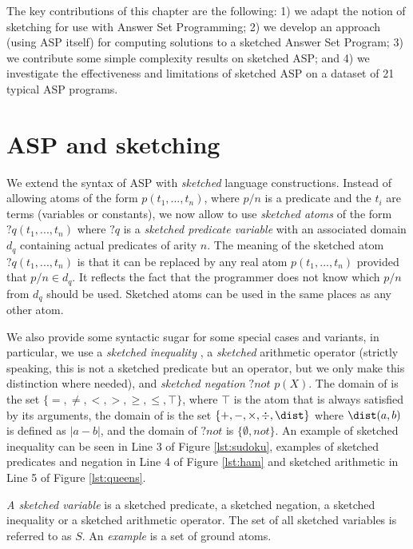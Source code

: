 The key contributions of this chapter are the following: 1) we adapt the notion of sketching for use with Answer Set Programming;
2) we develop an approach (using ASP itself) for computing solutions to a sketched Answer Set Program;
3) we contribute some simple complexity results on sketched ASP; 
and 4) we investigate the effectiveness and limitations of sketched ASP on a dataset of 21 typical ASP programs. 




\section{ASP and sketching }\label{sec:formal}
We extend the syntax of ASP with \textit{sketched} language constructions. 
Instead of allowing atoms of the form $p(t_1, ...,t_n)$, where $p/n$ is a predicate
and the $t_i$ are terms (variables or constants), we now allow to use
{\em sketched atoms} of the form $?q(t_1, ...,t_n)$ where $?q$ is a {\em sketched predicate variable}
with an associated domain $d_q$ containing actual predicates of arity $n$. 
The meaning of the sketched atom $?q(t_1, ... ,t_n)$ is that it can be replaced
by any real atom $p(t_1, ...,t_n)$ provided that $p/n \in d_q$.
It reflects the fact that the programmer does not know which $p/n$ from $ d_q$ should be used. 
Sketched atoms can be used in the same places as any other atom. 

We also provide some syntactic sugar for some special cases and variants,
in particular, we use a {\em sketched inequality} \sketchedeq, a  {\em sketched} arithmetic operator \sketchedplus (strictly speaking, this is not a sketched predicate but an operator, but we only make this distinction where needed), and {\em sketched negation} ${?}\textit{not } p(X)$.  The domain of \sketchedeq is the set $\{=,\neq,<,>,\geq,\leq,\top\}$, where $\top$ is the atom that is always satisfied by its arguments, the domain of \sketchedplus is the set $\{ +, -, \times, \div, \dist \}$ where $\dist(a,b)$ is defined as $| a - b |$, and the domain of ${?}\textit{not}$  is $\{\emptyset, not\}$. An example of sketched inequality can be seen in Line 3 of Figure \ref{lst:sudoku}, examples of sketched predicates and negation in Line 4 of Figure \ref{lst:ham} and sketched arithmetic in Line 5 of Figure \ref{lst:queens}.


\textit{A sketched variable} is a sketched predicate, a sketched negation, a sketched inequality or a sketched arithmetic operator. The set of all sketched variables is referred to  as $S$. 
An \textit{example} is a set of ground atoms. 

